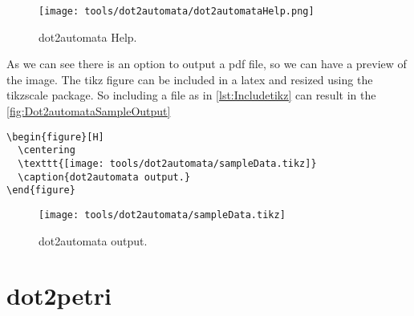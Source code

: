 \begin{figure}[H]
  \centering
  \texttt{[image: tools/dot2automata/dot2automataHelp.png]}
  \caption{dot2automata Help.}
  \label{fig:dot2automataHelp}
\end{figure}

As we can see there is an option to output a pdf file, so we can have a preview
of the image. The tikz figure can be included in a latex and resized using the
tikzscale package. So including a file as in \autoref{lst:Includetikz} can
result in the \autoref{fig:Dot2automataSampleOutput}

\begin{lstlisting}[caption=Include tikz file.,label={lst:Includetikz},numbers=none]
\begin{figure}[H]
  \centering
  \texttt{[image: tools/dot2automata/sampleData.tikz]}
  \caption{dot2automata output.}
\end{figure}
\end{lstlisting}
\begin{figure}[H]
  \centering
  \texttt{[image: tools/dot2automata/sampleData.tikz]}
  \caption{dot2automata output.}
  \label{fig:Dot2automataSampleOutput}
\end{figure}


% 

% 

% 

% 

% 

% 

% 

% 

\section{dot2petri}
\label{sec:dot2petri}

